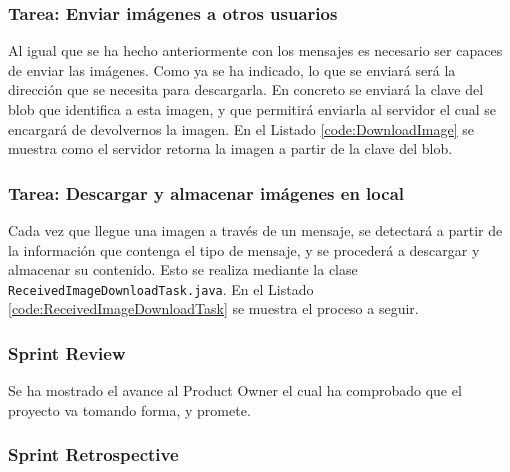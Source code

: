 


\subsubsection{Tarea: Enviar imágenes a otros usuarios}

Al igual que se ha hecho anteriormente con los mensajes es necesario ser capaces de enviar las imágenes. Como ya se ha indicado, lo que se enviará será la dirección que se necesita para descargarla. En concreto se enviará la clave del blob que identifica a esta imagen, y que permitirá enviarla al servidor el cual se encargará de devolvernos la imagen. En el Listado \ref{code:DownloadImage} se muestra como el servidor retorna la imagen a partir de la clave del blob.\\





\subsubsection{Tarea: Descargar y almacenar imágenes en local}

Cada vez que llegue una imagen a través de un mensaje, se detectará a partir de la información que contenga el tipo de mensaje, y se procederá a descargar y almacenar su contenido. Esto se realiza mediante la clase \texttt{ReceivedImageDownloadTask.java}. En el Listado \ref{code:ReceivedImageDownloadTask} se muestra el proceso a seguir.\\




\subsubsection{Sprint Review}

Se ha mostrado el avance al Product Owner el cual ha comprobado que el proyecto va tomando forma, y promete.

\subsubsection{Sprint Retrospective}

